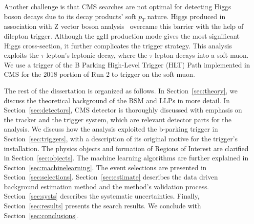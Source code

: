 Another challenge is that CMS searches are not optimal for detecting Higgs boson decays due to its decay products' soft $p_T$ nature.
Higgs produced in association with Z vector boson analysis~\cite{ZHAN} overcame this barrier with the help of dilepton trigger.
Although the ggH production mode gives the most significant Higgs cross-section, it further complicates the trigger strategy.
This analysis exploits the $\tau$ lepton's leptonic decay, where the $\tau$ lepton decays into a soft muon.
We use a trigger of the B Parking High-Level Trigger (HLT) Path implemented in CMS for the 2018 portion of Run 2 to trigger on the soft muon.



The rest of the dissertation is organized as follows.
In Section~\ref{sec:theory}, we discuss the theoretical background of the BSM and LLPs in more detail.
In Section~\ref{sec:detectors}, CMS detector is thoroughly discussed with emphasis on the tracker and the trigger system, which are relevant detector parts for the analysis.
We discuss how the analysis exploited the b-parking trigger in Section~\ref{sec:triggers}, with a description of its original motive for the trigger's installation.
The physics objects and formation of Regions of Interest are clarified in Section~\ref{sec:objects}.
The machine learning algorithms are further explained in Section~\ref{sec:machinelearning}.
The event selections are presented in Section~\ref{sec:selections}.
Section~\ref{sec:estimate} describes the data driven background estimation method and the method's validation process.
Section~\ref{sec:systs} describes the systematic uncertainties.
Finally, Section~\ref{sec:results} presents the search results.
We conclude with Section~\ref{sec:conclusions}.




